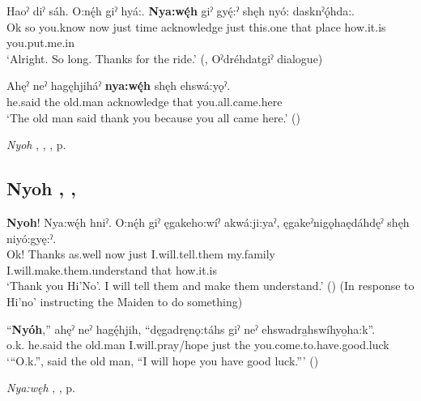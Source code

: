 \ea
\label{ex:npar132}
\gll Haoˀ diˀ sáh. O:nę́h giˀ hyá:. \textbf{Nya:wę́h} giˀ gyę́:ˀ shęh nyó: dasknˀǫ́hda:. \\
Ok so you.know now just time acknowledge just this.one that place how.it.is you.put.me.in\\
\glt ‘Alright. So long. Thanks for the ride.’ (\cite[339]{mithun_watewayestanih_1984}, Oˀdréhdatgiˀ dialogue)
\z

\ea
\label{ex:npar133}
\gll Ahęˀ neˀ hagęhjiháˀ \textbf{nya:wę́h} shęh ehswá:yǫˀ. \\
he.said the old.man acknowledge that you.all.came.here\\
\glt ‘The old man said thank you because you all came here.’ (\cite{keye_hnyagwaidatgigowah_2012})
\z

\begin{CayugaRelated}
\item \textit{Nyoh} , , , p. \pageref{p:[nyoh]}
\end{CayugaRelated}

\subsection*{\textbf{Nyoh} , , } \label{p:[nyoh]}


\ea
\label{ex:npar134}
\gll \textbf{Nyoh}! Nya:wę́h hniˀ. O:nę́h giˀ ęgakeho:wíˀ akwá:ji:yaˀ, ęgakeˀnigǫhaędáhdęˀ shęh niyó:gyę:ˀ. \\
Ok! Thanks as.well now just I.will.tell.them my.family I.will.make.them.understand that how.it.is \\
\glt ‘Thank you Hi’No’. I will tell them and make them understand.’ (\cite{carrier_legends_2013}) (In response to Hi’no’ instructing the Maiden to do something)
\z

\ea
\label{ex:npar135}
\gll “\textbf{Nyóh},” ahęˀ neˀ hagę́hjih, “dęgadręnǫ:táhs giˀ neˀ ehswadra̱hswíhyo̱ha:k”.\\
o.k. he.said the old.man I.will.pray/hope just the you.come.to.have.good.luck\\
\glt ‘“O.k.”, said the old man, “I will hope you have good luck.”’ (\cite{keye_hnyagwaidatgigowah_2012})
\z

\begin{CayugaRelated}
\item \textit{Nya:węh} , , p. \pageref{p:[nya:węh]}
\end{CayugaRelated}

